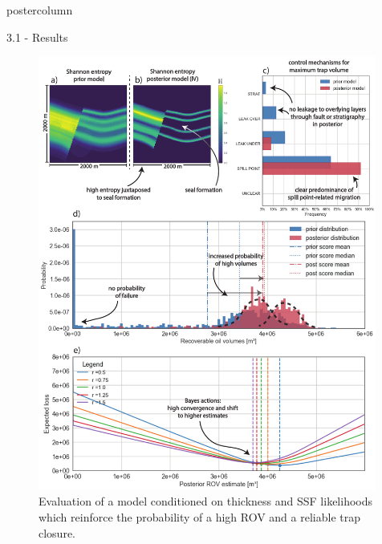 \documentclass{beamer}
\begin{document}
\begin{frame}
\begin{columns}
\begin{column}{.499\textwidth}
\begin{beamercolorbox}[center]{postercolumn}
\begin{minipage}{.98\textwidth}
{\begin{myblock}{3.1 - Results}				
	\vspace{0.2em}
	\begin{figure}
		\begin{minipage}{0.98\textwidth}
			\begin{minipage}[t]{0.49\textwidth}
				\centering\includegraphics[width=0.99\textwidth]{figures/ML4}
				\caption{Evaluation of a model conditioned on thickness and SSF likelihoods which reinforce the probability of a high ROV and a reliable trap closure.}

\end{minipage}
\end{minipage}
\end{figure}
\end{myblock}}
\end{minipage}
\end{beamercolorbox}
\end{column}
\end{columns}
\end{frame}
\end{document}
